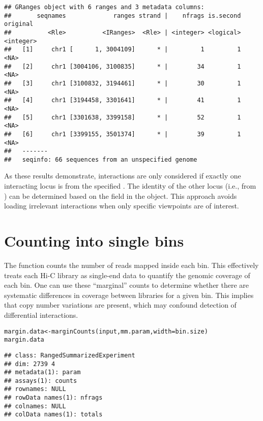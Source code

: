 \documentclass{report}\usepackage[]{graphicx}\usepackage[usenames,dvipsnames]{color}
\newcommand{\hlstd}[1]{\textcolor[rgb]{0.251,0.251,0.251}{#1}}%
\newcommand{\hlkwb}[1]{\textcolor[rgb]{0,0,0}{#1}}%
\newcommand{\hlkwc}[1]{\textcolor[rgb]{0.251,0.251,0.251}{#1}}%
\newcommand{\hlkwd}[1]{\textcolor[rgb]{0.878,0.439,0.125}{#1}}%
\newenvironment{knitrout}{}{} %
\begin{document}
\begin{knitrout}
\begin{kframe}
\begin{alltt}
\end{alltt}
\begin{verbatim}
## GRanges object with 6 ranges and 3 metadata columns:
##       seqnames             ranges strand |    nfrags is.second  original
##          <Rle>          <IRanges>  <Rle> | <integer> <logical> <integer>
##   [1]     chr1 [      1, 3004109]      * |         1         1      <NA>
##   [2]     chr1 [3004106, 3100835]      * |        34         1      <NA>
##   [3]     chr1 [3100832, 3194461]      * |        30         1      <NA>
##   [4]     chr1 [3194458, 3301641]      * |        41         1      <NA>
##   [5]     chr1 [3301638, 3399158]      * |        52         1      <NA>
##   [6]     chr1 [3399155, 3501374]      * |        39         1      <NA>
##   -------
##   seqinfo: 66 sequences from an unspecified genome
\end{verbatim}
\end{kframe}
\end{knitrout}

As these results demonstrate, interactions are only considered if exactly one interacting locus is from the specified .
The identity of the other locus (i.e., from ) can be determined based on the  field in the  object.
This approach avoids loading irrelevant interactions when only specific viewpoints are of interest.

\section{Counting into single bins}
\label{sec:marginal}
The  function counts the number of reads mapped inside each bin.
This effectively treats each Hi-C library as single-end data to quantify the genomic coverage of each bin.
One can use these ``marginal'' counts to determine whether there are systematic differences in coverage between libraries for a given bin.
This implies that copy number variations are present, which may confound detection of differential interactions.

\begin{knitrout}
\color{fgcolor}\begin{kframe}
\begin{alltt}
\hlstd{margin.data} \hlkwb{<-} \hlkwd{marginCounts}\hlstd{(input, mm.param,} \hlkwc{width}\hlstd{=bin.size)}
\hlstd{margin.data}
\end{alltt}
\begin{verbatim}
## class: RangedSummarizedExperiment 
## dim: 2739 4 
## metadata(1): param
## assays(1): counts
## rownames: NULL
## rowData names(1): nfrags
## colnames: NULL
## colData names(1): totals
\end{verbatim}
\end{kframe}
\end{knitrout}
\end{document}
